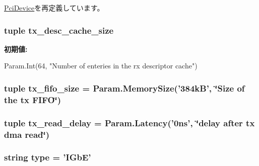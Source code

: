 \hyperlink{classPci_1_1PciDevice_a562a1b4e663fc1c10e0ee4e50270e43b}{PciDevice}を再定義しています。\hypertarget{classEthernet_1_1IGbE_af7155ed10ccac20bb6742fa6bcf25c7d}{
\subsubsection[{tx\_\-desc\_\-cache\_\-size}]{\setlength{\rightskip}{0pt plus 5cm}tuple {\bf tx\_\-desc\_\-cache\_\-size}}}
\label{classEthernet_1_1IGbE_af7155ed10ccac20bb6742fa6bcf25c7d}
{\bfseries 初期値:}
\begin{DoxyCode}
Param.Int(64,
        "Number of enteries in the rx descriptor cache")
\end{DoxyCode}
\hypertarget{classEthernet_1_1IGbE_ade05cdf962b2bfb207d5c864432949b8}{
\subsubsection[{tx\_\-fifo\_\-size}]{\setlength{\rightskip}{0pt plus 5cm}tuple {\bf tx\_\-fifo\_\-size} = Param.MemorySize('384kB', \char`\"{}Size of the tx FIFO\char`\"{})}}
\label{classEthernet_1_1IGbE_ade05cdf962b2bfb207d5c864432949b8}
\hypertarget{classEthernet_1_1IGbE_ae86cdda6316f1f620627c9899497aa73}{
\subsubsection[{tx\_\-read\_\-delay}]{\setlength{\rightskip}{0pt plus 5cm}tuple {\bf tx\_\-read\_\-delay} = Param.Latency('0ns', \char`\"{}delay after tx dma read\char`\"{})}}
\label{classEthernet_1_1IGbE_ae86cdda6316f1f620627c9899497aa73}
\hypertarget{classEthernet_1_1IGbE_acce15679d830831b0bbe8ebc2a60b2ca}{
\subsubsection[{type}]{\setlength{\rightskip}{0pt plus 5cm}string {\bf type} = '{\bf IGbE}'}}
\label{classEthernet_1_1IGbE_acce15679d830831b0bbe8ebc2a60b2ca}



